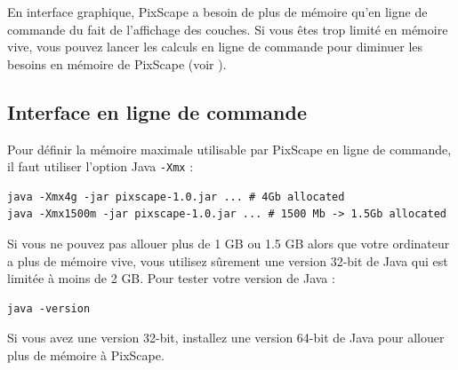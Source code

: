 \documentclass{report}
\begin{document}
En interface graphique, PixScape a besoin de plus de mémoire qu'en ligne de commande du fait de l'affichage des couches. Si vous êtes trop limité en mémoire vive, vous pouvez lancer les calculs en ligne de commande pour diminuer les besoins en mémoire de PixScape (voir ).

\subsection{Interface en ligne de commande}
Pour définir la mémoire maximale utilisable par PixScape en ligne de commande, il faut utiliser l'option Java \verb|-Xmx| :
\begin{Verbatim}
java -Xmx4g -jar pixscape-1.0.jar ... # 4Gb allocated
java -Xmx1500m -jar pixscape-1.0.jar ... # 1500 Mb -> 1.5Gb allocated
\end{Verbatim}


Si vous ne pouvez pas allouer plus de 1 GB ou 1.5 GB alors que votre ordinateur a plus de mémoire vive, vous utilisez sûrement une version 32-bit de Java qui est limitée à moins de 2 GB.
Pour tester votre version de Java :
\begin{Verbatim}
java -version
\end{Verbatim}
Si vous avez une version 32-bit, installez une version 64-bit de Java pour allouer plus de mémoire à PixScape.


\end{document}
